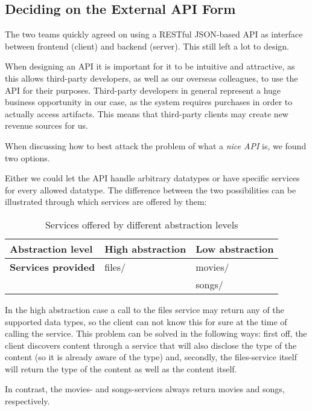 \subsection{Deciding on the External API Form}

The two teams quickly agreed on using a RESTful JSON-based API as interface between
frontend (client) and backend (server). This still left a lot to design.

When designing an API it is important for it to be intuitive and attractive, as this
allows third-party developers, as well as our overseas colleagues, to use the API for
their purposes. Third-party developers in general represent a huge business opportunity
in our case, as the system requires purchases in order to actually access artifacts. This
means that third-party clients may create new revenue sources for us.

When discussing how to best attack the problem of what a \emph{nice API} is, we found two
options.

Either we could let the API handle arbitrary datatypes or have specific services for
every allowed datatype. The difference between the two possibilities can be illustrated
through which services are offered by them:

\begin{table}[hbt]
    \centering
    \begin{tabular}{ | l | l | l | }
        \hline
        \textbf{Abstraction level} & High abstraction & Low abstraction \\
        \hline
        \textbf{Services provided} & files/ & movies/ \\
        &  & songs/ \\
        \hline
    \end{tabular}
    \caption{Services offered by different abstraction levels}
\end{table}

In the high abstraction case a call to the files service may return any of the supported
data types, so the client can not know this for sure at the time of calling the service.
This problem can be solved in the following ways: first off, the client discovers content
through a service that will also disclose the type of the content (so it is already aware
of the type) and, secondly, the files-service itself will return the type of the content
as well as the content itself.

In contrast, the movies- and songs-services always return movies and songs, respectively.

